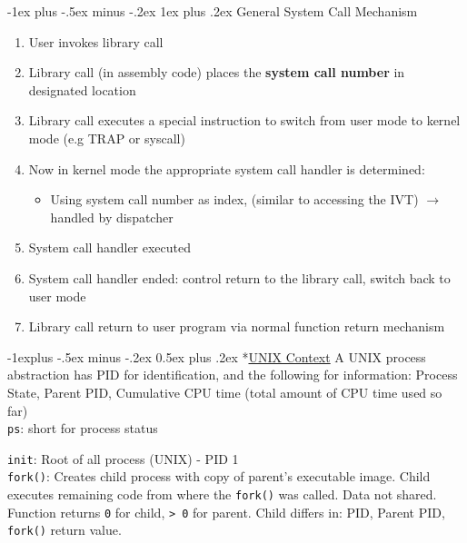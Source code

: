 \documentclass[10pt,landscape]{article}
\makeatletter
\renewcommand{\subsection}{\@startsection{section}{1}{0mm}%
                                {-1ex plus -.5ex minus -.2ex}%
                                {0.5ex plus .2ex}%
                                {\normalfont\large\bfseries}}
\renewcommand{\subsection}{\@startsection{subsection}{2}{0mm}%
                                {-1explus -.5ex minus -.2ex}%
                                {0.5ex plus .2ex}%
                                {\normalfont\normalsize\bfseries}}
\renewcommand{\subsubsection}{\@startsection{subsubsection}{3}{0mm}%
                                {-1ex plus -.5ex minus -.2ex}%
                                {1ex plus .2ex}%
                                {\normalfont\small\bfseries}}
\makeatother
\begin{document}
\begin{multicols*}{3}
\subsubsection{General System Call Mechanism}
\begin{enumerate}[topsep=0pt,noitemsep,wide=0pt, leftmargin=\dimexpr\labelwidth + 2\labelsep\relax]
    \item User invokes library call 
    \item Library call (in assembly code) places the \textbf{system call number} in designated location
    \item Library call executes a special instruction to switch from user mode to kernel mode (e.g TRAP or syscall)
    \item Now in kernel mode the appropriate system call handler is determined:
        \begin{itemize}[topsep=0pt,noitemsep,wide=0pt, leftmargin=\dimexpr{} + 2\relax]
            \item Using system call number as index, (similar to accessing the IVT) $\rightarrow$ handled by dispatcher
        \end{itemize}
    \item System call handler executed
    \item System call handler ended: control return to the library call, switch back to user mode
    \item Library call return to user program via normal function return mechanism
\end{enumerate}

\subsection*{\underline{UNIX Context}}
A UNIX process abstraction has PID for identification, and the following for information:
Process State, Parent PID, Cumulative CPU time (total amount of CPU time used so far) \\
\verb|ps|: short for process status

\verb|init|: Root of all process (UNIX) - PID 1 \\ 

\verb|fork()|: Creates child process with copy of parent's executable image. Child executes remaining code from where the \verb|fork()| was called.
Data not shared. Function returns \verb|0| for child, \verb|> 0| for parent. Child differs in: PID, Parent PID, \verb|fork()| return value. 


\end{multicols*}
\end{document}

